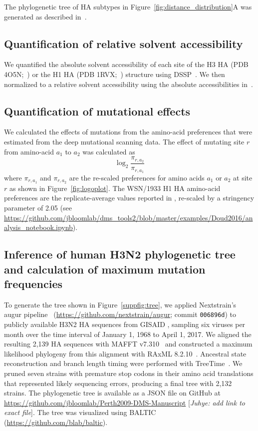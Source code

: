 \documentclass[9pt,twocolumn,twoside]{pnas-new}
\newcommand{\comment}[1]{{\color{red}[\textsl{#1}]}}
\begin{document}
{The phylogenetic tree of HA subtypes in Figure~\ref{fig:distance_distribution}A was generated as described in~\cite{doud2018quantifying}.

\subsection*{Quantification of relative solvent accessibility}
We quantified the absolute solvent accessibility of each site of the H3 HA (PDB 4O5N;~\cite{lee2014receptor}) or the H1 HA (PDB 1RVX;~\cite{gamblin2004structure}) structure using DSSP~\cite{kabsch1983}.
We then normalized to a relative solvent accessibility using the absolute accessibilities in~\cite{tien2013}.

\subsection*{Quantification of mutational effects}
We calculated the effects of mutations from the amino-acid preferences that were estimated from the deep mutational scanning data.
The effect of mutating site $r$ from amino-acid $a_1$ to $a_2$ was calculated as
\begin{equation}
\log_2 \frac{\pi_{r,a_2}}{\pi_{r,a_1}}
\end{equation}
where $\pi_{r,a_1}$ and $\pi_{r,a_2}$ are the re-scaled preferences for amino acids $a_1$ or $a_2$ at site $r$ as shown in Figure~\ref{fig:logoplot}.
The WSN/1933 H1 HA amino-acid preferences are the replicate-average values reported in \cite{doud2016accurate}, re-scaled by a stringency parameter of 2.05 (see \url{https://github.com/jbloomlab/dms_tools2/blob/master/examples/Doud2016/analysis_notebook.ipynb}).

\subsection*{Inference of human H3N2 phylogenetic tree and calculation of maximum mutation frequencies}
To generate the tree shown in Figure~\ref{suppfig:tree}, we applied Nextstrain's augur pipeline~\cite{Hadfield224048} (\url{https://github.com/nextstrain/augur}; commit \texttt{006896d}) to publicly available H3N2 HA sequences from GISAID \cite{shu2017gisaid}, sampling six viruses per month over the time interval of January 1, 1968 to April 1, 2017.
We aligned the resulting 2,139 HA sequences with MAFFT v7.310~\cite{katoh2013mafft} and constructed a maximum likelihood phylogeny from this alignment with RAxML 8.2.10~\cite{stamatakis2006raxml}.
Ancestral state reconstruction and branch length timing were performed with TreeTime~\cite{Sagulenko2018}.
We pruned seven strains with premature stop codons in their amino acid translations that represented likely sequencing errors, producing a final tree with 2,132 strains.
The phylogenetic tree is available as a JSON file on GitHub at \url{https://github.com/jbloomlab/Perth2009-DMS-Manuscript} \comment{Juhye: add link to exact file}.
The tree was visualized using BALTIC (\url{https://github.com/blab/baltic}).

}
\end{document}
